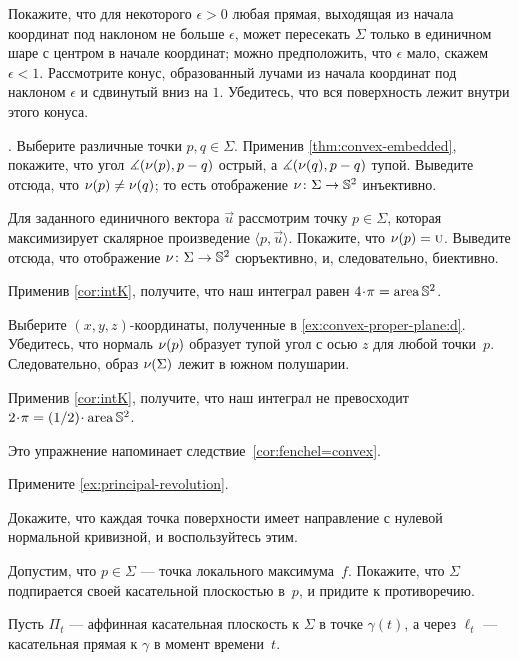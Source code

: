 Покажите, что для некоторого $\epsilon>0$ любая прямая, выходящая из начала координат под наклоном не больше $\epsilon$, может пересекать $\Sigma$ только в единичном шаре с центром в начале координат;
можно предположить, что $\epsilon$ мало, скажем $\epsilon<1$.
Рассмотрите конус, образованный лучами из начала координат под наклоном $\epsilon$ и сдвинутый вниз на $1$.
Убедитесь, что вся поверхность лежит внутри этого конуса.

\parbf{\ref{ex:intK}}.
Выберите различные точки $p,q\in\Sigma$.
Применив \ref{thm:convex-embedded}, покажите, что угол $\measuredangle(\Norm(p),p\z-q)$ острый, а $\measuredangle(\Norm(q),p\z-q)$ тупой.
Выведите отсюда, что $\nu(p)\ne\nu(q)$;
то есть отображение $\nu\colon\Sigma\to\mathbb{S}^2$ инъективно.

Для заданного единичного вектора $\vec u$ рассмотрим точку $p\in \Sigma$, которая максимизирует скалярное произведение $\langle p,\vec u\rangle$.
Покажите, что $\nu(p)=\text{\sc{u}}$.
Выведите отсюда, что отображение $\nu\colon\Sigma\to\mathbb{S}^2$ сюръективно, и, следовательно, биективно.

Применив \ref{cor:intK}, получите, что наш интеграл равен $4\cdot\pi=\area\mathbb{S}^2$.

Выберите $(x,y,z)$-координаты, полученные в \ref{ex:convex-proper-plane:d}.
Убедитесь, что нормаль $\nu(p)$ образует тупой угол с осью $z$ для любой точки~$p$.
Следовательно, образ $\nu(\Sigma)$ лежит в южном полушарии.

Применив \ref{cor:intK}, получите, что наш интеграл не превосходит $2\cdot\pi=\tfrac12\cdot\area\mathbb{S}^2$.

Это упражнение напоминает следствие~\ref{cor:fenchel=convex}.

\setcounter{eqtn}{0}

Примените \ref{ex:principal-revolution}.

Докажите, что каждая точка поверхности имеет направление с нулевой нормальной кривизной, и воспользуйтесь этим.

Допустим, что $p\in \Sigma$ --- точка локального максимума~$f$.
Покажите, что $\Sigma$ подпирается своей касательной плоскостью в~$p$,
и придите к противоречию.

Пусть $\Pi_t$ --- аффинная касательная плоскость к $\Sigma$ в точке $\gamma(t)$, а через $\ell_t$ --- касательная прямая к $\gamma$ в момент времени~$t$.

